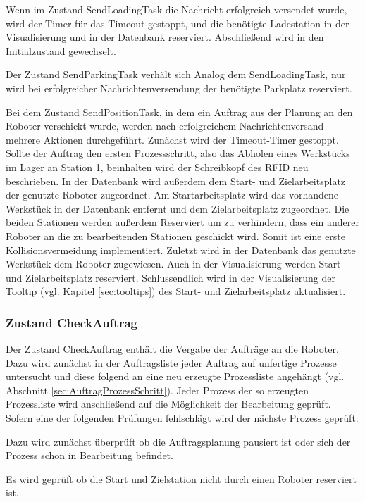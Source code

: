 Wenn im Zustand SendLoadingTask die Nachricht erfolgreich versendet wurde, wird der Timer für das Timeout gestoppt, und die benötigte Ladestation in der Visualisierung und in der Datenbank reserviert. Abschließend wird in den Initialzustand gewechselt.

Der Zustand SendParkingTask verhält sich Analog dem SendLoadingTask, nur wird bei erfolgreicher Nachrichtenversendung der benötigte Parkplatz reserviert.

Bei dem Zustand SendPositionTask, in dem ein Auftrag aus der Planung an den Roboter verschickt wurde, werden nach erfolgreichem Nachrichtenversand mehrere Aktionen durchgeführt. Zunächst wird der Timeout-Timer gestoppt. Sollte der Auftrag den ersten Prozessschritt, also das Abholen eines Werkstücks im Lager an Station 1, beinhalten wird der Schreibkopf des RFID neu beschrieben. In der Datenbank wird außerdem dem Start- und Zielarbeitsplatz der genutzte Roboter zugeordnet. Am Startarbeitsplatz wird das vorhandene Werkstück in der Datenbank entfernt und dem Zielarbeitsplatz zugeordnet. Die beiden Stationen werden außerdem Reserviert um zu verhindern, dass ein anderer Roboter an die zu bearbeitenden Stationen geschickt wird. Somit ist eine erste Kollisionsvermeidung implementiert. Zuletzt wird in der Datenbank das genutzte Werkstück dem Roboter zugewiesen. Auch in der Visualisierung werden Start- und Zielarbeitsplatz reserviert. Schlussendlich wird in der Visualisierung der Tooltip (vgl. Kapitel \ref{sec:tooltips}) des Start- und Zielarbeitsplatz aktualisiert.

\subsubsection{Zustand CheckAuftrag}
\label{sec:CheckAuftrag}

Der Zustand CheckAuftrag enthält die Vergabe der Aufträge an die Roboter. 
Dazu wird zunächst in der Auftragsliste jeder Auftrag auf unfertige Prozesse untersucht und diese folgend an eine neu erzeugte Prozessliste angehängt (vgl. Abschnitt \ref{sec:AuftragProzessSchritt}). Jeder Prozess der so erzeugten Prozessliste wird anschließend auf die Möglichkeit der Bearbeitung geprüft. Sofern eine der folgenden Prüfungen fehlschlägt wird der nächste Prozess geprüft.

Dazu wird zunächst überprüft ob die Auftragsplanung pausiert ist oder sich der Prozess schon in Bearbeitung befindet. 

Es wird geprüft ob die Start und Zielstation nicht durch einen Roboter reserviert ist.

